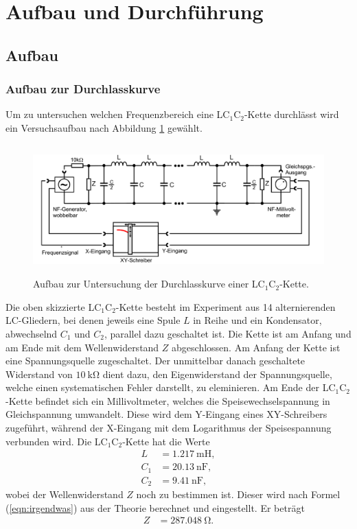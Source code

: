 \section{Aufbau und Durchführung}
\label{sec:Durchführung}
\subsection{Aufbau}
\label{sec:Aufbau}
\subsubsection{Aufbau zur Durchlasskurve}Um zu untersuchen welchen Frequenzbereich eine LC$_1$C$_2$-Kette durchlässt wird ein Versuchsaufbau nach Abbildung \ref{dfig:1} gewählt.

\begin{figure}[H]
  \centering
  \includegraphics[height=5cm]{durchlass.png}
  \caption{Aufbau zur Untersuchung der Durchlasskurve einer LC$_1$C$_2$-Kette. \cite{sample}}
  \label{dfig:1}
\end{figure}

Die oben skizzierte LC$_1$C$_2$-Kette besteht im Experiment aus 14 alternierenden LC-Gliedern, bei denen jeweils eine Spule $L$ in Reihe und ein Kondensator, abwechselnd $C_1$ und $C_2$, parallel dazu geschaltet ist.
Die Kette ist am Anfang und am Ende mit dem Wellenwiderstand $Z$ abgeschlossen.
Am Anfang der Kette ist eine Spannungsquelle zugeschaltet.
Der unmittelbar danach geschaltete Widerstand von $\SI{10}{\kilo\ohm}$ dient dazu, den Eigenwiderstand der Spannungsquelle, welche einen systematischen Fehler darstellt, zu eleminieren.
Am Ende der LC$_1$C$_2$-Kette befindet sich ein Millivoltmeter, welches die Speisewechselspannung in Gleichspannung umwandelt.
Diese wird dem Y-Eingang eines XY-Schreibers zugeführt, während der X-Eingang mit dem Logarithmus der Speisespannung verbunden wird.
Die LC$_1$C$_2$-Kette hat die Werte
\begin{align*}
  L   &= \SI{1,217}{\milli\henry},\\
  C_1 &= \SI{20,13}{\nano\farad},\\
  C_2 &= \SI{9,41}{\nano\farad},
\end{align*}
wobei der Wellenwiderstand $Z$ noch zu bestimmen ist.
Dieser wird nach Formel (\ref{eqn:irgendwas}) aus der Theorie berechnet und eingestellt.
Er beträgt
\begin{align*}
  Z   &= \SI{287.048}{\ohm}.
\end{align*}

